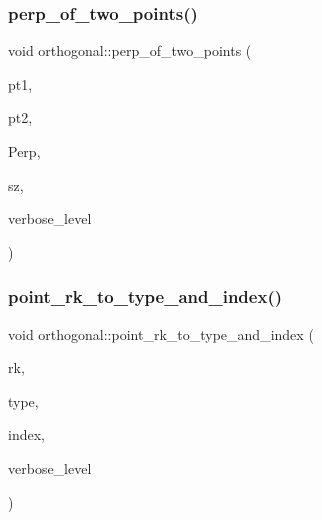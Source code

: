\subsubsection{\texorpdfstring{perp\+\_\+of\+\_\+two\+\_\+points()}{perp\_of\_two\_points()}}
{\footnotesize\ttfamily void orthogonal\+::perp\+\_\+of\+\_\+two\+\_\+points (\begin{DoxyParamCaption}\item[{\mbox{\hyperlink{galois_8h_a09fddde158a3a20bd2dcadb609de11dc}{I\+NT}}}]{pt1,  }\item[{\mbox{\hyperlink{galois_8h_a09fddde158a3a20bd2dcadb609de11dc}{I\+NT}}}]{pt2,  }\item[{\mbox{\hyperlink{galois_8h_a09fddde158a3a20bd2dcadb609de11dc}{I\+NT}} $\ast$}]{Perp,  }\item[{\mbox{\hyperlink{galois_8h_a09fddde158a3a20bd2dcadb609de11dc}{I\+NT}} \&}]{sz,  }\item[{\mbox{\hyperlink{galois_8h_a09fddde158a3a20bd2dcadb609de11dc}{I\+NT}}}]{verbose\+\_\+level }\end{DoxyParamCaption})}

\mbox{\label{classorthogonal_a5419c9c6b60c81e6e66f3606e7ad1815}} 
\subsubsection{\texorpdfstring{point\+\_\+rk\+\_\+to\+\_\+type\+\_\+and\+\_\+index()}{point\_rk\_to\_type\_and\_index()}}
{\footnotesize\ttfamily void orthogonal\+::point\+\_\+rk\+\_\+to\+\_\+type\+\_\+and\+\_\+index (\begin{DoxyParamCaption}\item[{\mbox{\hyperlink{galois_8h_a09fddde158a3a20bd2dcadb609de11dc}{I\+NT}}}]{rk,  }\item[{\mbox{\hyperlink{galois_8h_a09fddde158a3a20bd2dcadb609de11dc}{I\+NT}} \&}]{type,  }\item[{\mbox{\hyperlink{galois_8h_a09fddde158a3a20bd2dcadb609de11dc}{I\+NT}} \&}]{index,  }\item[{\mbox{\hyperlink{galois_8h_a09fddde158a3a20bd2dcadb609de11dc}{I\+NT}}}]{verbose\+\_\+level }\end{DoxyParamCaption})}

